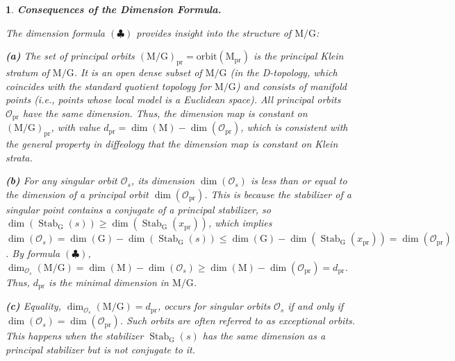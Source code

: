 \documentclass[10pt,reqno,letterpaper,twoside]{amsart}
\theoremstyle{article}
\newtheorem{article}{}
\def\artlabel[#1]{\textbf{#1.}}
\newcommand{\cO}{{\mathcal O}}
\def \G{\mathrm G}
\def \M{\mathrm M}
\DeclareMathOperator{\Stab}{Stab}
\newcommand{\orbit}{{\mathrm{orbit}}}
\begin{document}
  \begin{article}
    \artlabel[Consequences of the Dimension Formula]
    \label{Consequences_of_Dimension_Formula}
    
    The dimension formula $(\clubsuit)$ provides insight into the structure of $\M/\G$:
    
    \textbf{(a)} The set of principal orbits $(\M/\G)_{\mathrm{pr}} = \orbit(\M_{\mathrm{pr}})$ is the \emph{principal Klein stratum} of $\M/\G$.
    It is an open dense subset of $\M/\G$
    (in the D-topology, which coincides with the standard quotient topology for $\M/\G$)
    and consists of manifold points (i.e., points whose local model is a Euclidean space).
    All principal orbits $\cO_{\mathrm{pr}}$ have the same dimension.
    Thus,
    the dimension map is constant on $(\M/\G)_{\mathrm{pr}}$,
    with value $d_{\mathrm{pr}} = \dim(\M) - \dim(\cO_{\mathrm{pr}})$,
    which is consistent with the general property in diffeology that the dimension map is constant on Klein strata.
    
    \textbf{(b)} For any singular orbit $\cO_s$,
    its dimension $\dim(\cO_s)$ is less than or equal to the dimension of a principal orbit $\dim(\cO_{\mathrm{pr}})$.
    This is because the stabilizer of a singular point contains a conjugate of a principal stabilizer,
    so $\dim(\Stab_\G(s)) \ge \dim(\Stab_\G(x_{\mathrm{pr}}))$,
    which implies $\dim(\cO_s) = \dim(\G) - \dim(\Stab_\G(s)) \le \dim(\G) - \dim(\Stab_\G(x_{\mathrm{pr}})) = \dim(\cO_{\mathrm{pr}})$.
    By formula $(\clubsuit)$, $\dim_{\cO_s}(\M/\G) = \dim(\M) - \dim(\cO_s) \ge \dim(\M) - \dim(\cO_{\mathrm{pr}}) = d_{\mathrm{pr}}$.
    Thus,
    $d_{\mathrm{pr}}$ is the minimal dimension in $\M/\G$.
    
    \textbf{(c)} Equality,
    $\dim_{\cO_s}(\M/\G) = d_{\mathrm{pr}}$,
    occurs for singular orbits $\cO_s$ if and only if $\dim(\cO_s) = \dim(\cO_{\mathrm{pr}})$.
    Such orbits are often referred to as \emph{exceptional orbits}.
    This happens when the stabilizer $\Stab_\G(s)$ has the same dimension as a principal stabilizer but is not conjugate to it.
    
  \end{article}
  
  
\end{document}
